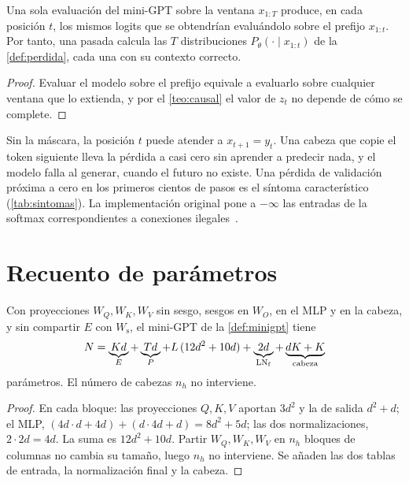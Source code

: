 \begin{corolario}\label{cor:una-pasada}
Una sola evaluación del mini-GPT sobre la ventana $x_{1:T}$ produce, en cada posición $t$, los mismos logits que se obtendrían evaluándolo sobre el prefijo $x_{1:t}$. Por tanto, una pasada calcula las $T$ distribuciones $P_\theta(\cdot\mid x_{1:t})$ de la \cref{def:perdida}, cada una con su contexto correcto.
\end{corolario}

\begin{proof}
Evaluar el modelo sobre el prefijo equivale a evaluarlo sobre cualquier ventana que lo extienda, y por el \cref{teo:causal} el valor de $z_t$ no depende de cómo se complete.
\end{proof}

\begin{observacion}\label{obs:fuga}
Sin la máscara, la posición $t$ puede atender a $x_{t+1}=y_t$. Una cabeza que copie el token siguiente lleva la pérdida a casi cero sin aprender a predecir nada, y el modelo falla al generar, cuando el futuro no existe. Una pérdida de validación próxima a cero en los primeros cientos de pasos es el síntoma característico (\cref{tab:sintomas}). La implementación original pone a $-\infty$ las entradas de la softmax correspondientes a conexiones ilegales~\cite[§3.2.3]{vaswani}.
\end{observacion}

\section{Recuento de parámetros}

\begin{proposicion}\label{prop:parametros}
Con proyecciones $W_Q,W_K,W_V$ sin sesgo, sesgos en $W_O$, en el MLP y en la cabeza, y sin compartir $E$ con $W_{\mathrm{s}}$, el mini-GPT de la \cref{def:minigpt} tiene
\[
N=\underbrace{Kd}_{E}+\underbrace{Td}_{P}+L\,(12d^{2}+10d)+\underbrace{2d}_{\operatorname{LN}_{\mathrm{f}}}+\underbrace{dK+K}_{\text{cabeza}}
\]
parámetros. El número de cabezas $n_h$ no interviene.
\end{proposicion}

\begin{proof}
En cada bloque: las proyecciones $Q,K,V$ aportan $3d^{2}$ y la de salida $d^{2}+d$; el MLP, $(4d\cdot d+4d)+(d\cdot 4d+d)=8d^{2}+5d$; las dos normalizaciones, $2\cdot 2d=4d$. La suma es $12d^{2}+10d$. Partir $W_Q,W_K,W_V$ en $n_h$ bloques de columnas no cambia su tamaño, luego $n_h$ no interviene. Se añaden las dos tablas de entrada, la normalización final y la cabeza.
\end{proof}

